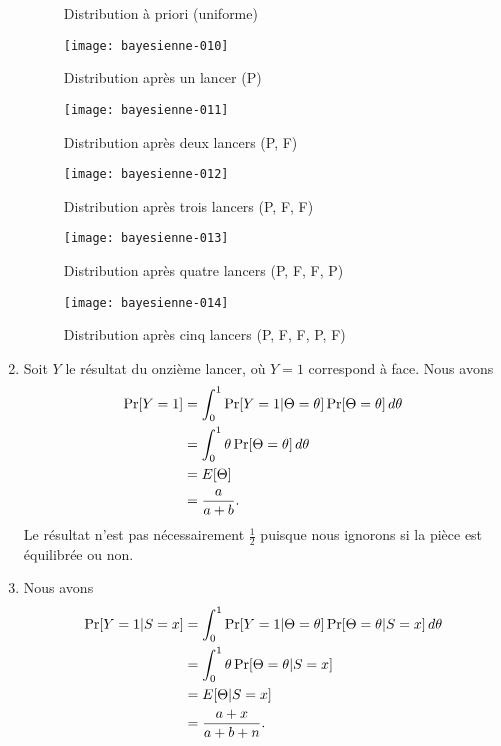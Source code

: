 \begin{exercice}
\begin{sol}
\begin{enumerate}
\begin{figure}
\begin{minipage}[t]{0.45\textwidth}
          \caption{Distribution à priori (uniforme)}
          \label{fig:bayesienne:beta0}
        \end{minipage}
        \hfill
        \begin{minipage}[t]{0.45\textwidth}
\texttt{[image: bayesienne-010]}
          \caption{Distribution après un lancer (P)}
        \end{minipage}
        \begin{minipage}[t]{0.45\textwidth}
\texttt{[image: bayesienne-011]}
          \caption{Distribution après deux lancers (P, F)}
        \end{minipage}
        \hfill
        \begin{minipage}[t]{0.45\textwidth}
\texttt{[image: bayesienne-012]}
          \caption{Distribution après trois lancers (P, F, F)}
        \end{minipage}
        \begin{minipage}[t]{0.45\textwidth}
\texttt{[image: bayesienne-013]}
          \caption{Distribution après quatre lancers (P, F, F, P)}
        \end{minipage}
        \hfill
        \begin{minipage}[t]{0.45\textwidth}
\texttt{[image: bayesienne-014]}
          \caption{Distribution après cinq lancers (P, F, F, P, F)}
          \label{fig:bayesienne:beta5}
        \end{minipage}
      \end{figure}
    \item Soit $Y$ le résultat du onzième lancer, où $Y = 1$
      correspond à face. Nous avons
      \begin{align*}
        \Pr[Y = 1]
        &= \int_0^1 \Pr[Y = 1|\Theta = \theta]
        \Pr[\Theta = \theta]\, d\theta \\
        &= \int_0^1 \theta \Pr[\Theta = \theta]\, d\theta \\
        &= E [ \Theta ] \\
        &= \frac{a}{a + b}.
      \end{align*}
      Le résultat n'est pas nécessairement $\frac{1}{2}$ puisque nous
      ignorons si la pièce est équilibrée ou non.
    \item Nous avons
      \begin{align*}
        \Pr[Y = 1|S = x]
        &= \int_0^1 \Pr[Y = 1|\Theta = \theta]
        \Pr[\Theta = \theta|S = x]\, d\theta \\
        &= \int_0^1 \theta \Pr[\Theta = \theta|S = x] \\
        &= E [ \Theta|S = x ] \\
        &= \frac{a + x}{a + b + n}.
      \end{align*}
    \end{enumerate}
  \end{sol}
\end{exercice}

